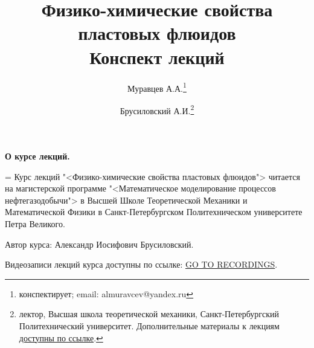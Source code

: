 \documentclass[a4paper,12pt]{article}
\newenvironment{nohyphen}
  {\tolerance=1
   \emergencystretch=\maxdimen
   \hyphenpenalty=10000
   \hbadness=10000}
  {\par}
\begin{document}
	
	\textbf{О курсе лекций.}
	
	\begin{nohyphen}
	Курс лекций "<Физико-химические свойства пластовых флюидов"> читается на магистерской программе "<Математическое моделирование процессов нефтегазодобычи"> в Высшей Школе Теоретической Механики и Математической Физики в Санкт-Петербургском Политехническом университете Петра Великого.
	
	Автор курса: Александр Иосифович Брусиловский.
	
	Видеозаписи лекций курса доступны по ссылке: \href{https://csspbstu-my.sharepoint.com/:f:/g/personal/muravtsev_aa_edu_spbstu_ru/Epiacj6WFMBHqIF6E3YQgCMB7yi5NAA1ycqFLqrTZMhJ4w?e=i2agP0}{GO TO RECORDINGS}.
	\end{nohyphen}
	\setlength{\parindent}{10mm}
	
	\vspace*{7mm}
	\tableofcontents
	\title{Физико-химические свойства пластовых флюидов\\Конспект лекций}
	\author{Муравцев А.А.\thanks{конспектирует; email: almuravcev@yandex.ru}
	\and
	Брусиловский А.И.\thanks{лектор, Высшая школа теоретической механики, Санкт-Петербургский Политехнический университет. Дополнительные материалы к лекциям \href{https://csspbstu-my.sharepoint.com/:f:/g/personal/muravtsev_aa_edu_spbstu_ru/Epiacj6WFMBHqIF6E3YQgCMB7yi5NAA1ycqFLqrTZMhJ4w?e=i2agP0}{доступны по ссылке}.}}
	\maketitle
	
	\newpage
	
	\newpage
	
	\newpage
	
	\newpage
	
\end{document}
